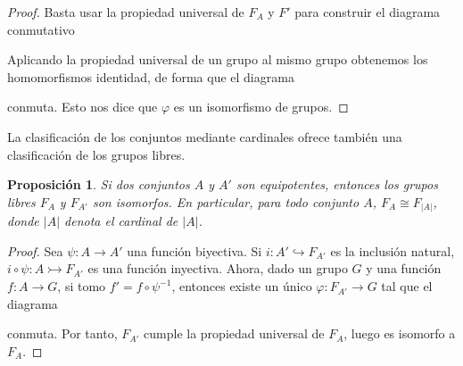 \documentclass[12pt,a4paper]{book}
\newtheorem{prop}[thm]{Proposición}
\theoremstyle{definition} \newtheorem{defn}[thm]{Definición}
\theoremstyle{definition} \newtheorem{ejemplo}[thm]{Ejemplo}
\theoremstyle{definition} \newtheorem{ejercicio}[thm]{Ejercicio}
\theoremstyle{remark} \newtheorem*{obs}{Observación}
\def\id{\mathbf{1}}
\begin{document}
 \begin{proof}
   Basta usar la propiedad universal de $F_A$ y $F'$ para construir el diagrama conmutativo
  \begin{center}
   \end{center}
   Aplicando la propiedad universal de un grupo al mismo grupo obtenemos los homomorfismos identidad, de forma que el diagrama
   \begin{center}
   \end{center}
   conmuta. Esto nos dice que $\varphi$ es un isomorfismo de grupos.
 \end{proof}
 La clasificación de los conjuntos mediante cardinales ofrece también una clasificación de los grupos libres.
 \begin{prop}
   Si dos conjuntos $A$ y $A'$ son equipotentes, entonces los grupos libres $F_A$ y $F_{A'}$ son isomorfos. En particular, para todo conjunto $A$, $F_A\cong F_{|A|}$, donde $|A|$ denota el cardinal de $|A|$.
 \end{prop}
 \begin{proof}
   Sea $\psi:A\rightarrow A'$ una función biyectiva. Si $i:A'\hookrightarrow F_{A'}$ es la inclusión natural, $i\circ \psi: A\rightarrowtail F_{A'}$ es una función inyectiva. Ahora, dado un grupo $G$ y una función $f:A\rightarrow G$, si tomo $f'=f\circ \psi^{-1}$, entonces existe un único $\varphi:F_{A'}\rightarrow G$ tal que el diagrama
   \begin{center}
   \end{center}
   conmuta. Por tanto, $F_{A'}$ cumple la propiedad universal de $F_A$, luego es isomorfo a $F_A$.
 \end{proof}
\end{document}
